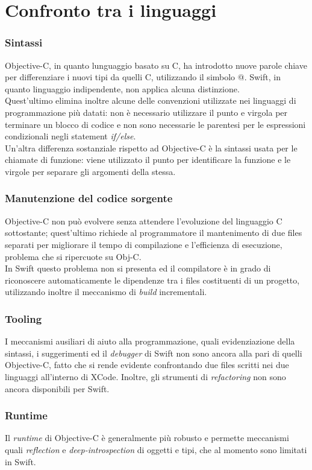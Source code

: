 \chapter{Confronto tra i linguaggi}
\subsection{Sintassi}
Objective-C, in quanto lunguaggio basato su C, ha introdotto nuove parole chiave per differenziare i nuovi tipi da quelli C, utilizzando il simbolo @. Swift, in quanto linguaggio indipendente, non applica alcuna distinzione.\\
Quest'ultimo elimina inoltre alcune delle convenzioni utilizzate nei linguaggi di programmazione più datati: non è necessario utilizzare il punto e virgola per terminare un blocco di codice e non sono necessarie le parentesi per le espressioni condizionali negli statement \textit{if/else}.\\
Un'altra differenza sostanziale rispetto ad Objective-C è la sintassi usata per le chiamate di funzione: viene utilizzato il punto per identificare la funzione e le virgole per separare gli argomenti della stessa.
\subsection{Manutenzione del codice sorgente}
Objective-C non può evolvere senza attendere l'evoluzione del linguaggio C sottostante; quest'ultimo richiede al programmatore il mantenimento di due files separati per migliorare il tempo di compilazione e l'efficienza di esecuzione, problema che si ripercuote su Obj-C.\\
In Swift questo problema non si presenta ed il compilatore è in grado di riconoscere automaticamente le dipendenze tra i files costituenti di un progetto, utilizzando inoltre il meccanismo di \textit{build} incrementali.
\subsection{Tooling}
I meccanismi ausiliari di aiuto alla programmazione, quali evidenziazione della sintassi, i suggerimenti ed il \textit{debugger} di Swift non sono ancora alla pari di quelli Objective-C, fatto che si rende evidente confrontando due files scritti nei due linguaggi all'interno di XCode. Inoltre, gli strumenti di \textit{refactoring} non sono ancora disponibili per Swift.
\subsection{Runtime}
Il \textit{runtime} di Objective-C è generalmente più robusto e permette meccanismi quali \textit{reflection} e \textit{deep-introspection} di oggetti e tipi, che al momento sono limitati in Swift.
